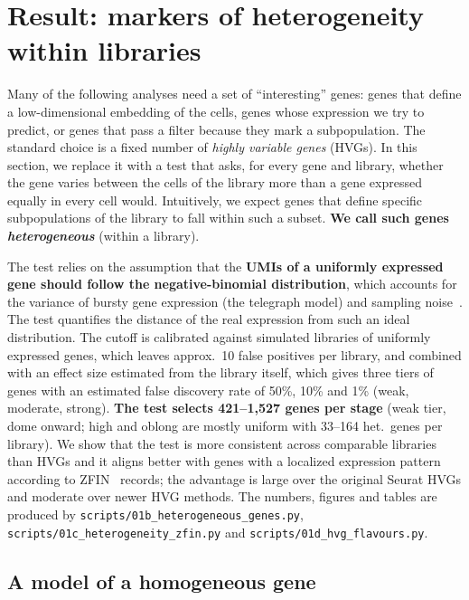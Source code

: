\documentclass[11pt,a4paper]{article}
\begin{document}
\section{Result: markers of heterogeneity within libraries}
\label{sec:heterogeneity}

Many of the following analyses need a set of ``interesting'' genes: genes that define a low-dimensional embedding of the cells, genes whose expression we try to predict, or genes that pass a filter because they mark a subpopulation. The standard choice is a fixed number of \emph{highly variable genes} (HVGs). In this section, we replace it with a test that asks, for every gene and library, whether the gene varies between the cells of the library more than a gene expressed equally in every cell would. Intuitively, we expect genes that define specific subpopulations of the library to fall within such a subset. \textbf{We call such genes \emph{heterogeneous}} (within a library).

The test relies on the assumption that the \textbf{UMIs of a uniformly expressed gene should follow the negative-binomial distribution}, which accounts for the variance of bursty gene expression (the telegraph model) and sampling noise~\cite{grun2014noise,raj2006bursting}. The test quantifies the distance of the real expression from such an ideal distribution. The cutoff is calibrated against simulated libraries of uniformly expressed genes, which leaves approx.~10 false positives per library, and combined with an effect size estimated from the library itself, which gives three tiers of genes with an estimated false discovery rate of 50\%, 10\% and 1\% (weak, moderate, strong). \textbf{The test selects 421--1{,}527 genes per stage} (weak tier, dome onward; high and oblong are mostly uniform with 33--164 het.~genes per library). We show that the test is more consistent across comparable libraries than HVGs and it aligns better with genes with a localized expression pattern according to ZFIN~\cite{bradford2022zfin} records; the advantage is large over the original Seurat HVGs and moderate over newer HVG methods. The numbers, figures and tables are produced by \nolinkurl{scripts/01b_heterogeneous_genes.py}, \nolinkurl{scripts/01c_heterogeneity_zfin.py} and \nolinkurl{scripts/01d_hvg_flavours.py}.

\subsection{A model of a homogeneous gene}
\end{document}

